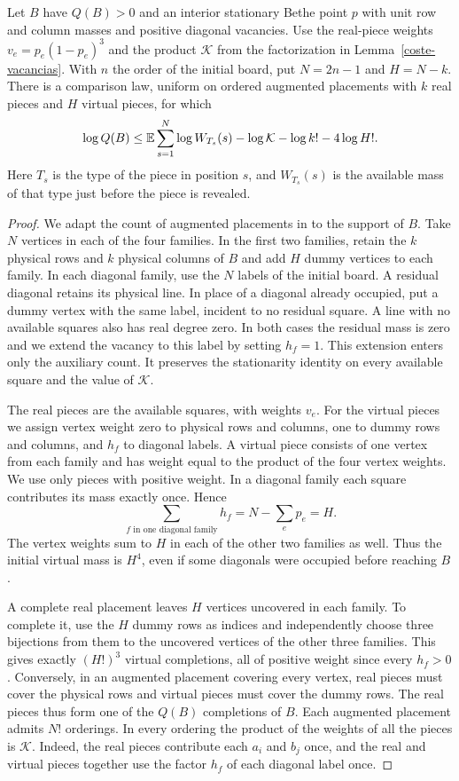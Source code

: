 \begin{lema}\label{coste-comparacion}
Let $B$ have $Q(B)>0$ and an interior stationary Bethe point $p$ with unit row and column
masses and positive diagonal vacancies. Use the real-piece weights $v_e=p_e(1-p_e)^3$ and the
product $\mathcal K$ from the factorization in Lemma~\ref{coste-vacancias}.
With $n$ the order of the initial board, put $N=2n-1$ and $H=N-k$.
There is a comparison law, uniform on ordered augmented placements with $k$ real pieces and $H$
virtual pieces, for which
\[
 \log Q(B)\le
 \mathbb{E}\sum_{s=1}^N\log W_{T_s}(s)
       -\log\mathcal K-\log k!-4\log H! .
\]
Here $T_s$ is the type of the piece in position $s$, and $W_{T_s}(s)$ is the available mass
of that type just before the piece is revealed.
\end{lema}
\begin{proof}
We adapt the count of augmented placements in \cite[Sections~3.1--3.4 and
Theorem~3.6]{ultimas} to the support of $B$.
Take $N$ vertices in each of the four families. In the first two families, retain the $k$ physical
rows and $k$ physical columns of $B$ and add $H$ dummy vertices to each family. In each diagonal
family, use the $N$ labels of the initial board. A residual diagonal retains its physical line.
In place of a diagonal already occupied, put a dummy vertex with the same label, incident to no
residual square. A line with no available squares also has real degree zero. In both cases the
residual mass is zero and we extend the vacancy to this label by setting $h_f=1$. This extension enters
only the auxiliary count. It preserves the stationarity identity on every available square and
the value of $\mathcal K$.

The real pieces are the available squares, with weights $v_e$. For the virtual pieces we assign
vertex weight zero to physical rows and columns, one to dummy rows and columns, and $h_f$ to
diagonal labels. A virtual piece consists of one vertex from each family and has weight equal to
the product of the four vertex weights. We use only pieces with positive weight. In a diagonal
family each square contributes its mass exactly once. Hence
\[
 \sum_{f\text{ in one diagonal family}}h_f=N-\sum_e p_e=H.
\]
The vertex weights sum to $H$ in each of the other two families as well. Thus the initial virtual
mass is $H^4$, even if some diagonals were occupied before reaching $B$.

A complete real placement leaves $H$ vertices uncovered in each family. To complete it, use the
$H$ dummy rows as indices and independently choose three bijections from them to the uncovered
vertices of the other three families. This gives exactly $(H!)^3$ virtual completions, all of
positive weight since every $h_f>0$. Conversely, in an augmented placement covering every vertex,
real pieces must cover the physical rows and virtual pieces must cover the dummy rows. The real
pieces thus form one of the $Q(B)$ completions of $B$. Each augmented placement admits $N!$
orderings. In every ordering the product of the weights of all the pieces is $\mathcal K$.
Indeed, the real pieces contribute each $a_i$ and $b_j$ once, and the real and virtual pieces
together use the factor $h_f$ of each diagonal label once.


\end{proof}
